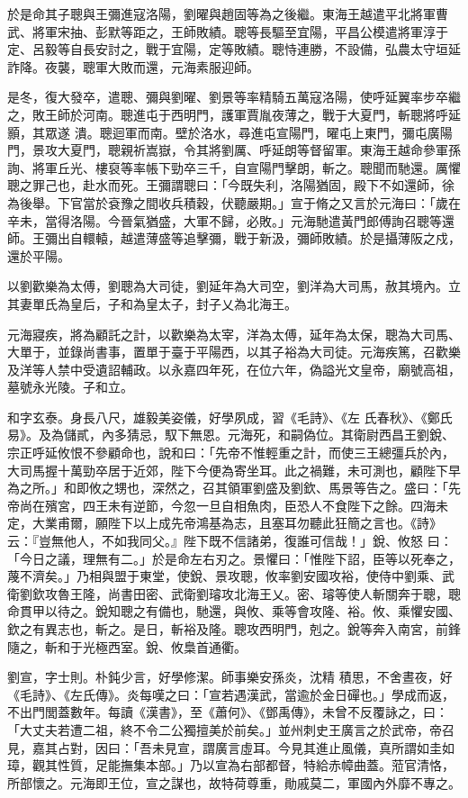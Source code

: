 \begin{pinyinscope}
 於是命其子聰與王彌進寇洛陽，劉曜與趙固等為之後繼。東海王越遣平北將軍曹武、將軍宋抽、彭默等距之，王師敗績。聰等長驅至宜陽，平昌公模遣將軍淳于定、呂毅等自長安討之，戰于宜陽，定等敗績。聰恃連勝，不設備，弘農太守垣延詐降。夜襲，聰軍大敗而還，元海素服迎師。



 是冬，復大發卒，遣聰、彌與劉曜、劉景等率精騎五萬寇洛陽，使呼延翼率步卒繼之，敗王師於河南。聰進屯于西明門，護軍賈胤夜薄之，戰于大夏門，斬聰將呼延顥，其眾遂
 潰。聰迴軍而南。壁於洛水，尋進屯宣陽門，曜屯上東門，彌屯廣陽門，景攻大夏門，聰親祈嵩嶽，令其將劉厲、呼延朗等督留軍。東海王越命參軍孫詢、將軍丘光、樓裒等率帳下勁卒三千，自宣陽門擊朗，斬之。聰聞而馳還。厲懼聰之罪己也，赴水而死。王彌謂聰曰：「今既失利，洛陽猶固，殿下不如還師，徐為後舉。下官當於袞豫之間收兵積穀，伏聽嚴期。」宣于脩之又言於元海曰：「歲在辛未，當得洛陽。今晉氣猶盛，大軍不歸，必敗。」元海馳遣黃門郎傅詢召聰等還師。王彌出自轘轅，越遣薄盛等追擊彌，戰于新汲，彌師敗績。於是攝薄阪之戍，還於平陽。



 以劉歡樂為太傅，劉聰為大司徒，劉延年為大司空，劉洋為大司馬，赦其境內。立其妻單氏為皇后，子和為皇太子，封子乂為北海王。



 元海寢疾，將為顧託之計，以歡樂為太宰，洋為太傅，延年為太保，聰為大司馬、大單于，並錄尚書事，置單于臺于平陽西，以其子裕為大司徒。元海疾篤，召歡樂及洋等人禁中受遺詔輔政。以永嘉四年死，在位六年，偽謚光文皇帝，廟號高祖，墓號永光陵。子和立。



 和字玄泰。身長八尺，雄毅美姿儀，好學夙成，習《毛詩》、《左
 氏春秋》、《鄭氏易》。及為儲貳，內多猜忌，馭下無恩。元海死，和嗣偽位。其衛尉西昌王劉銳、宗正呼延攸恨不參顧命也，說和曰：「先帝不惟輕重之計，而使三王總彊兵於內，大司馬握十萬勁卒居于近郊，陛下今便為寄坐耳。此之禍難，未可測也，顧陛下早為之所。」和即攸之甥也，深然之，召其領軍劉盛及劉欽、馬景等告之。盛曰：「先帝尚在殯宮，四王未有逆節，今忽一旦自相魚肉，臣恐人不食陛下之餘。四海未定，大業甫爾，願陛下以上成先帝鴻基為志，且塞耳勿聽此狂簡之言也。《詩》云：『豈無他人，不如我同父。』陛下既不信諸弟，復誰可信哉！」銳、攸怒
 曰：「今日之議，理無有二。」於是命左右刃之。景懼曰：「惟陛下詔，臣等以死奉之，蔑不濟矣。」乃相與盟于東堂，使銳、景攻聰，攸率劉安國攻裕，使侍中劉乘、武衛劉欽攻魯王隆，尚書田密、武衛劉璿攻北海王乂。密、璿等使人斬關奔于聰，聰命貫甲以待之。銳知聰之有備也，馳還，與攸、乘等會攻隆、裕。攸、乘懼安國、欽之有異志也，斬之。是日，斬裕及隆。聰攻西明門，剋之。銳等奔入南宮，前鋒隨之，斬和于光極西室。銳、攸梟首通衢。



 劉宣，字士則。朴鈍少言，好學修潔。師事樂安孫炎，沈精
 積思，不舍晝夜，好《毛詩》、《左氏傳》。炎每嘆之曰：「宣若遇漢武，當逾於金日磾也。」學成而返，不出門閭蓋數年。每讀《漢書》，至《蕭何》、《鄧禹傳》，未曾不反覆詠之，曰：「大丈夫若遭二祖，終不令二公獨擅美於前矣。」並州刺史王廣言之於武帝，帝召見，嘉其占對，因曰：「吾未見宣，謂廣言虛耳。今見其進止風儀，真所謂如圭如璋，觀其性質，足能撫集本部。」乃以宣為右部都督，特給赤幛曲蓋。蒞官清恪，所部懷之。元海即王位，宣之謀也，故特荷尊重，勛戚莫二，軍國內外靡不專之。



\end{pinyinscope}